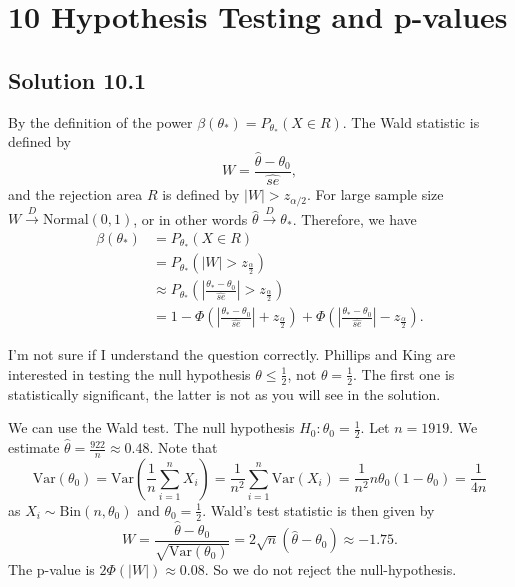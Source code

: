 \section*{10 Hypothesis Testing and p-values}

\subsection*{Solution 10.1}

By the definition of the power $\beta(\theta_*) = P_{\theta_*}(X \in R)$.
The Wald statistic is defined by
\begin{equation*}
    W = \frac{\hat{\theta} - \theta_0}{\hat{se}},
\end{equation*}
and the rejection area $R$ is defined by $|W| > z_{\alpha/2}$.
For large sample size $W \xrightarrow{D} \mathrm{Normal}(0, 1)$, or in other words $\hat{\theta} \xrightarrow{D} \theta_*$.
Therefore, we have
\begin{equation*}
    \begin{split}
        \beta(\theta_*)
            &= P_{\theta_*}(X \in R) \\
            &= P_{\theta_*}(|W| > z_{\frac{\alpha}{2}}) \\
            &\approx P_{\theta_*}\left(\left|\frac{\theta_* - \theta_0}{\hat{se}}\right| > z_{\frac{\alpha}{2}}\right) \\
            &= 1 - \Phi\left(\left|\frac{\theta_* - \theta_0}{\hat{se}}\right| + z_{\frac{\alpha}{2}}\right)
                + \Phi\left(\left|\frac{\theta_* - \theta_0}{\hat{se}}\right| - z_{\frac{\alpha}{2}}\right).
    \end{split}
\end{equation*}

I'm not sure if I understand the question correctly.
Phillips and King are interested in testing the null hypothesis $\theta \leq \frac{1}{2}$, not $\theta = \frac{1}{2}$.
The first one is statistically significant, the latter is not as you will see in the solution.

We can use the Wald test.
The null hypothesis $H_0: \theta_0 = \frac{1}{2}$.
Let $n = 1919$.
We estimate $\hat{\theta} = \frac{922}{n} \approx 0.48$.
Note that
$$
\mathrm{Var}(\theta_0)
    = \mathrm{Var}(\frac{1}{n} \sum_{i=1}^n X_i)
    = \frac{1}{n^2} \sum_{i=1}^n \mathrm{Var}(X_i)
    = \frac{1}{n^2} n \theta_0 (1 - \theta_0)
    = \frac{1}{4n}
$$
as $X_i \sim \mathrm{Bin}(n, \theta_0)$ and $\theta_0 = \frac{1}{2}$.
Wald's test statistic is then given by
$$
W = \frac{\hat{\theta} - \theta_0}{\sqrt{\mathrm{Var}(\theta_0)}}
    = 2\sqrt{n} (\hat{\theta} - \theta_0)
    \approx -1.75.
$$
The p-value is $2\Phi(|W|) \approx 0.08$.
So we do not reject the null-hypothesis.

